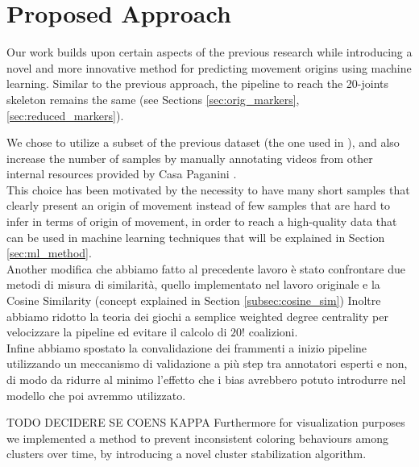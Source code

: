 \chapter{Proposed Approach}

Our work builds upon certain aspects of the previous research while introducing a novel and more innovative method for predicting movement origins using machine learning. 
Similar to the previous approach, the pipeline to reach the 20-joints skeleton remains the same (see Sections \ref{sec:orig_markers}, \ref{sec:reduced_markers}).

We chose to utilize a subset of the previous dataset (the one used in \cite{kolykhalova:2020}), and also increase the number of samples by manually annotating videos from other internal resources provided by Casa Paganini \cite{casaPaganini}.\\ 
This choice has been motivated by the necessity to have many short samples that clearly present an origin of movement instead of few samples that are hard to infer in terms of origin of movement, in order to 
reach a high-quality data that can be used in machine learning techniques that will be explained in Section \ref{sec:ml_method}.\\
Another modifica che abbiamo fatto al precedente lavoro è stato confrontare due metodi di misura di similarità, quello implementato nel lavoro originale e la Cosine Similarity (concept explained in Section \ref{subsec:cosine_sim})
Inoltre abbiamo ridotto la teoria dei giochi a semplice weighted degree centrality per velocizzare la pipeline ed evitare il calcolo di $20!$ coalizioni.\\
Infine abbiamo spostato la convalidazione dei frammenti a inizio pipeline utilizzando un meccanismo di validazione a più step tra annotatori esperti e non, di modo da ridurre al minimo l'effetto che i bias avrebbero potuto introdurre nel modello che poi avremmo utilizzato.

TODO DECIDERE SE COENS KAPPA
Furthermore for visualization purposes we implemented a method to prevent inconsistent coloring behaviours among clusters over time, by introducing a novel cluster stabilization algorithm. 

